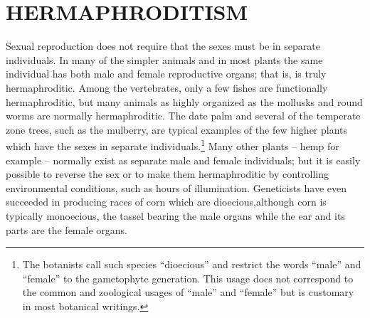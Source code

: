 \section*{HERMAPHRODITISM}

Sexual reproduction does not require that the sexes must be in
separate individuals. In many of the simpler animals and in most plants
the same individual has both male and female reproductive organs;
that is, is truly hermaphroditic. Among the vertebrates, only a few fishes
are functionally hermaphroditic, but many animals as highly organized
as the mollusks and round worms are normally hermaphroditic. The
date palm and several of the temperate zone trees, such as the mulberry,
are typical examples of the few higher plants which have the sexes in
separate individuals.\footnote{The botanists call such species ``dioecious''
and restrict the words ``male'' and ``female'' to the gametophyte generation.
This usage docs not correspond to the common and zoological usages of
``male'' and ``female'' but is customary in most botanical writings.} Many
other plants -- hemp for example -- normally exist as separate male and
female individuals; but it is easily possible to reverse the sex or to make
them hermaphroditic by controlling environmental conditions, such as hours
of illumination. Geneticists have even succeeded in producing races of corn
which are dioecious,although corn is typically monoecious, the tassel
bearing the male organs while the ear and its parts are the female organs.

